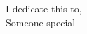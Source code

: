 \begin{dedication}
\null\vfil
{\large
\begin{center}
I dedicate this to,\\\vspace{12pt}
Someone special\\\vspace{12pt}
\end{center}}
\vfil\null
\end{dedication}
